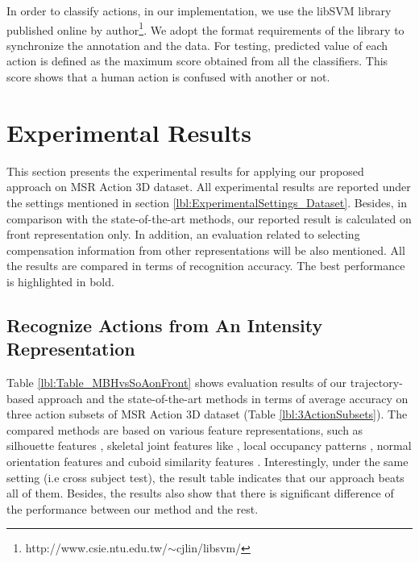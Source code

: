 \documentclass[review]{elsarticle}
\begin{document}
In order to classify actions, in our implementation, we use the libSVM library published online by author\footnote{http://www.csie.ntu.edu.tw/$\sim$cjlin/libsvm/}. We adopt the format requirements of the library to synchronize the annotation and the data. For testing, predicted value of each action is defined as the maximum score obtained from all the classifiers. This score shows that a human action is confused with another or not.

\section{Experimental Results}
\label{lbl:ExperimentalResults}
This section presents the experimental results for applying our proposed approach on MSR Action 3D dataset. All experimental results are reported under the settings mentioned in section \ref{lbl:ExperimentalSettings_Dataset}. Besides, in comparison with the state-of-the-art methods, our reported result is calculated on front representation only. In addition, an evaluation related to selecting compensation information from other representations will be also mentioned. All the results are compared in terms of recognition accuracy. The best performance is highlighted in bold.

\subsection{Recognize Actions from An Intensity Representation}

Table \ref{lbl:Table_MBHvsSoAonFront} shows evaluation results of our trajectory-based approach and the state-of-the-art methods in terms of average accuracy  on three action subsets of MSR Action 3D dataset (Table \ref{lbl:3ActionSubsets}). The compared methods are based on various feature representations, such as silhouette features \cite{li2010action, yang2012recognizing}, skeletal joint features like \cite{yang2012eigenjoints, wang2012mining}, local occupancy patterns \cite{wang2012robust, vieira2012stop}, normal orientation features \cite{oreifej2013hon4d} and cuboid similarity features \cite{xia2013spatio}. Interestingly, under the same setting (i.e cross subject test), the result table indicates that our approach beats all of them. Besides, the results also show that there is significant difference of the performance between our method and the rest.
\end{document}
